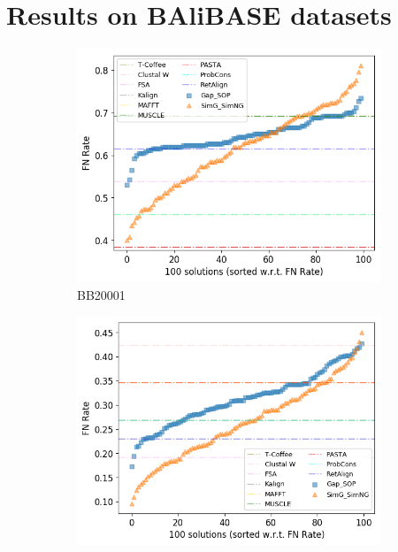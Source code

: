 \section{Results on BAliBASE datasets}
\label{sec:result_balibase}
\begin{figure}[!htbp]
	\centering
	\begin{adjustwidth}{-1cm}{-1cm}
		\begin{subfigure}{0.22\textwidth}
			\includegraphics[width=\columnwidth]{Figure/summary/precomputedInit/Balibase/BB20001_fnrate_density_single_run}
			\caption{BB20001}
		\end{subfigure}	
		\begin{subfigure}{0.22\textwidth}
			\includegraphics[width=\columnwidth]{Figure/summary/precomputedInit/Balibase/BB20010_fnrate_density_single_run}

\end{subfigure}
\end{adjustwidth}
\end{figure}
